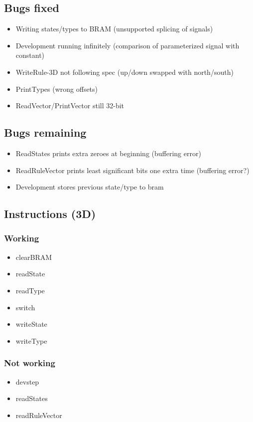 \subsection{Bugs fixed}

\begin{itemize}
    \item Writing states/types to BRAM (unsupported splicing of signals)
    \item Development running infinitely (comparison of parameterized signal with constant)
    \item WriteRule-3D not following spec (up/down swapped with north/south)
    \item PrintTypes (wrong offsets)
    \item ReadVector/PrintVector still 32-bit
\end{itemize}

\subsection{Bugs remaining}

\begin{itemize}
    \item ReadStates prints extra zeroes at beginning (buffering error)
    \item ReadRuleVector prints least significant bits one extra time (buffering error?)
    \item Development stores previous state/type to bram
\end{itemize}

\subsection{Instructions (3D)}

\subsubsection{Working}

\begin{itemize}
    \item clearBRAM
    \item readState
    \item readType
    \item switch
    \item writeState
    \item writeType
\end{itemize}

\subsubsection{Not working}

\begin{itemize}
    \item devstep
    \item readStates
    \item readRuleVector
\end{itemize}

